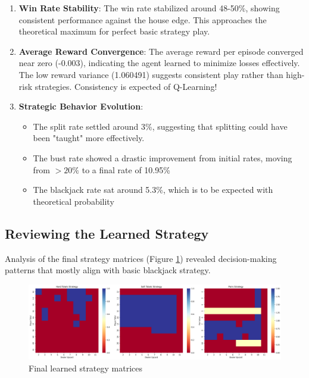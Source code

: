 \documentclass[10pt]{article}
\theoremstyle{definition}
\begin{document}
\begin{enumerate}
    \item \textbf{Win Rate Stability}: The win rate stabilized around 48-50\%, showing consistent performance against the house edge. This approaches the theoretical maximum for perfect basic strategy play.

    \item \textbf{Average Reward Convergence}: The average reward per episode converged near zero (-0.003), indicating the agent learned to minimize losses effectively. The low reward variance (1.060491) suggests consistent play rather than high-risk strategies. Consistency is expected of Q-Learning!

    \item \textbf{Strategic Behavior Evolution}:
    \begin{itemize}
        \item The split rate settled around 3\%, suggesting that splitting could have been "taught" more effectively.
        \item The bust rate showed a drastic improvement from initial rates, moving from $>20\%$ to a final rate of 10.95\%
        \item The blackjack rate sat around 5.3\%, which is to be expected with theoretical probability
    \end{itemize}
\end{enumerate}
\subsection{Reviewing the Learned Strategy}

Analysis of the final strategy matrices (Figure \ref{fig:strategy_matrices}) revealed decision-making patterns that mostly align with basic blackjack strategy.

\begin{figure}[H]
    \centering
    \includegraphics[width=\textwidth]{./images/agent_strategy.png}
    \caption{Final learned strategy matrices}
    \label{fig:strategy_matrices}
\end{figure}
\end{document}
